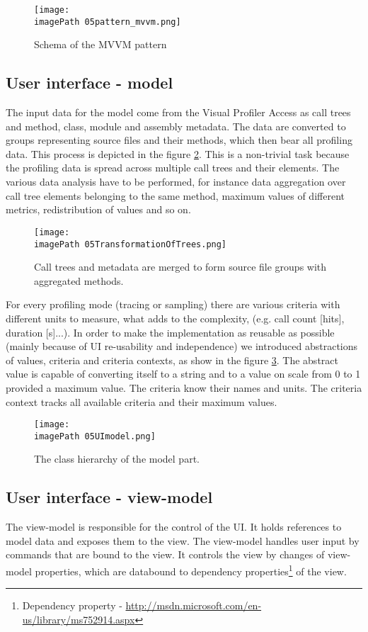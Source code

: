 \begin{figure}
	\centering
		\texttt{[image: \\imagePath 05pattern\_mvvm.png]}
		\caption{Schema of the MVVM pattern \cite{WPFpage}}
	\label{fig:05pattern_mvvm}
\end{figure}

\subsection{User interface - model}
The input data for the model come from the Visual Profiler Access as call trees and method, class, module and assembly metadata. The data are converted to groups representing source files and their methods, which then bear all profiling data. This process is depicted in the figure \ref{fig:05TransformationOfTrees}. This is a non-trivial task because the profiling data is spread across multiple call trees and their elements. The various data analysis have to be performed, for instance data aggregation over call tree elements belonging to the same method, maximum values of different metrics, redistribution of values and so on.

 \begin{figure}
	\centering
		\texttt{[image: \\imagePath 05TransformationOfTrees.png]}
		\caption{Call trees and metadata are merged to form source file groups with aggregated methods.}
	\label{fig:05TransformationOfTrees}
\end{figure}

For every profiling mode (tracing or sampling) there are various criteria with different units to measure, what adds to the complexity, (e.g. call count [hits], duration [s]...). In order to make the implementation as reusable as possible (mainly because of UI re-usability and independence) we introduced abstractions of values, criteria and criteria contexts, as show in the figure \ref{fig:05UImodel}. The abstract value is capable of converting itself to a string and to a value on scale from 0 to 1 provided a maximum value. The criteria know their names and units. The criteria context tracks all available criteria and their maximum values. 

 \begin{figure}
	\centering
		\texttt{[image: \\imagePath 05UImodel.png]}
		\caption{The class hierarchy of the model part.}
	\label{fig:05UImodel}
\end{figure}

\subsection{User interface - view-model}
The view-model is responsible for the control of the UI. It holds references to model data and exposes them to the view. The view-model handles user input by commands that are bound to the view. It controls the view by changes of view-model properties, which are databound to dependency properties\footnote{Dependency property - \href{http://msdn.microsoft.com/en-us/library/ms752914.aspx}{http://msdn.microsoft.com/en-us/library/ms752914.aspx}} of the view.

